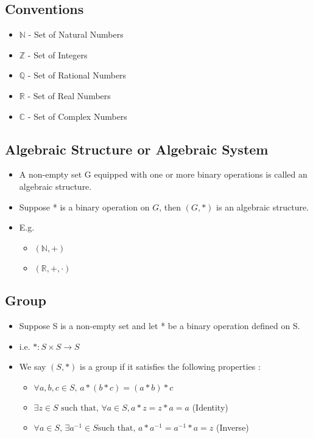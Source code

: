 \documentclass[twoside]{article}
\begin{document}
	\subsection{Conventions}
	\begin{itemize}
		\item $\mathbb N$ - Set of Natural Numbers
		\item $\mathbb Z$ - Set of Integers
		\item $\mathbb Q$ - Set of Rational Numbers
		\item $\mathbb R$ - Set of Real Numbers
		\item $\mathbb C$ - Set of Complex Numbers
		
	\end{itemize}
	
	\subsection{Algebraic Structure or Algebraic System}
	\begin{itemize}
		\item A non-empty set G equipped with one or more binary operations is called an algebraic structure.
		\item Suppose * is a binary operation on $G$, then $(G,*)$ is an algebraic structure.
		\item E.g.
		\begin{itemize}
			\item $(\mathbb N, +)$
			\item $(\mathbb R, +, \cdot)$
		\end{itemize}
	\end{itemize}
	
	\subsection{Group}
	\begin{itemize}
		\item Suppose S is a non-empty set and let * be a binary operation defined on S.
		\item i.e. $* : S \times S \rightarrow S$ 
		\item We say $(S,*)$ is a group if it satisfies the following properties :
		\begin{itemize}
			\item $\forall a,b,c \in S \text{, }  a * (b * c) = (a * b) * c$
			\item $\exists z \in S \text{ such that, } \forall a \in S, a * z = z * a = a $ (Identity)
			\item $\forall a \in S \text{, } \exists a^{-1} \in S \text{such that, } a * a^{-1} = a^{-1} * a = z$ (Inverse)
		\end{itemize}
	\end{itemize}
	
\end{document}
